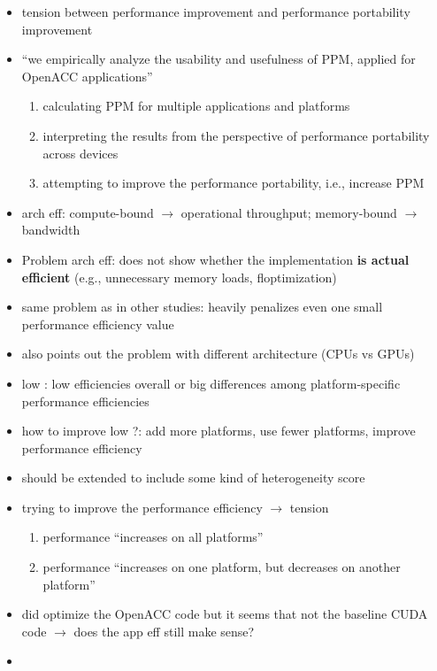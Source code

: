 \begin{itemize}
    \item tension between performance improvement and performance portability improvement
    \item \enquote{we empirically analyze the usability and usefulness of PPM, applied for OpenACC applications}
    \begin{enumerate}
        \item calculating PPM for multiple applications and platforms
        \item interpreting the results from the perspective of performance portability across devices
        \item attempting to improve the performance portability, i.e., increase PPM
    \end{enumerate}
    \item arch eff: compute-bound $\rightarrow$ operational throughput; memory-bound $\rightarrow$ bandwidth
    \item Problem arch eff: does not show whether the implementation \textbf{is actual efficient} (e.g., unnecessary memory loads, floptimization)
    \item same problem as in other studies: \pp heavily penalizes even one small performance efficiency value
    \item also points out the problem with different architecture (CPUs vs GPUs)
    \item low \pp: low efficiencies overall or big differences among platform-specific performance efficiencies
    \item how to improve low \pp?: add more platforms, use fewer platforms, improve performance efficiency
    \item \pp should be extended to include some kind of heterogeneity score
    \item trying to improve the performance efficiency $\rightarrow$ tension
    \begin{enumerate}
        \item performance \enquote{increases on all platforms}
        \item performance \enquote{increases on one platform, but decreases on another platform}
    \end{enumerate}
    \item did optimize the OpenACC code but it seems that not the baseline CUDA code $\rightarrow$ does the app eff still make sense?
    \item 
\end{itemize}


